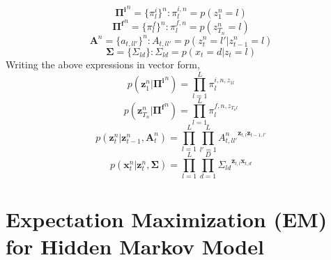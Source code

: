 \documentclass[reqno]{amsart}
\numberwithin{equation}{section}
\begin{document}
\begin{equation}
\mathbf{\Pi^i}^n = \{\pi_l^i\}^n : \pi_l^{i,n} = p(z_1^n = l)
\end{equation}
\begin{equation}
\mathbf{\Pi^f}^n = \{\pi_l^f\}^n : \pi_l^{f,n} = p(z_{T_n}^n = l)
\end{equation}
\begin{equation}
\mathbf{A}^n = \{a_{t,ll'}\}^n : A_{t,ll'} = p(z_t^n = l' | z_{t-1}^n = l)
\end{equation}
\begin{equation}
\mathbf{\Sigma} = \{\Sigma_{ld}\} : \Sigma_{ld} = p(x_t = d | z_t = l)
\end{equation}
Writing the above expressions in vector form,
\begin{equation}
p(\mathbf{z}_1^n|\mathbf{\Pi^i}^n) = \displaystyle\prod_{l=1}^{L} \pi_l^{i,n,z_{1l}}
\end{equation}
\begin{equation}
p(\mathbf{z}_{T_n}^n|\mathbf{\Pi^f}^n) = \displaystyle\prod_{l=1}^{L} \pi_l^{f,n,z_{T_n l}}
\end{equation}
\begin{equation}
p(\mathbf{z}_{t}^n|\mathbf{z}_{t-1}^n,\mathbf{A}_t^n) = \displaystyle\prod_{l=1}^{L}\prod_{l'=1}^{L} {A_{t,ll'}^n}^{\mathbf{z}_{t,l}\mathbf{z}_{t-1,l'}}
\end{equation}
\begin{equation}
p(\mathbf{x}_{t}^n|\mathbf{z}_{t}^n,\mathbf{\Sigma}) = \displaystyle\prod_{l=1}^{L}\prod_{d=1}^{D} {\Sigma_{ld}}^{\mathbf{z}_{t,l}\mathbf{x}_{t,d}}
\end{equation}

\section{Expectation Maximization (EM) for Hidden Markov Model}
\end{document}

